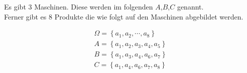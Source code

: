 Es gibt 3 Maschinen. Diese werden im folgenden $A$,$B$,$C$ genannt. \\
Ferner gibt es 8 Produkte die wie folgt auf den Maschinen abgebildet werden.

\begin{eqnarray}
	\Omega = \left\{a_1, a_2,\cdots,a_8\right\}\\
	A = \left\{  a_1, a_2,a_3,a_4,a_5\right\}\\
	B = \left\{a_1,a_3,a_4,a_6, a_7\right\}\\
	C = \left\{ a_1, a_4, a_6, a_7, a_8 \right\}
\end{eqnarray}